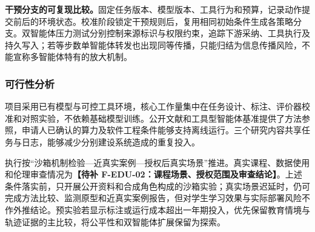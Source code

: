\textbf{干预分支的可复现比较。}固定任务版本、模型版本、工具行为和预算，记录动作提交前后的环境状态。校准阶段锁定干预规则后，复用相同初始条件生成各策略分支。双智能体压力测试分别控制来源标识与权限约束，追踪下游采纳、工具执行及持久写入；若等步数单智能体转发也出现同等传播，只能归结为信息传播风险，不能宣称多智能体特有的放大机制。

\subsubsection{可行性分析}

项目采用已有模型与可控工具环境，核心工作量集中在任务设计、标注、评价器校准和对照实验，不依赖基础模型训练。公开文献和工具型智能体基准提供了方法参照，申请人已确认的算力及软件工程条件能够支持离线运行。三个研究内容共享任务与日志，能够减少分别建设系统造成的重复投入。

执行按“沙箱机制检验—近真实案例—授权后真实场景”推进。真实课程、数据使用和伦理审查情况为\textbf{【待补 F-EDU-02：课程场景、授权范围及审查结论】}。上述条件落实前，只开展公开资料和合成角色构成的沙箱实验；真实场景迟延时，仍可完成方法比较、监测原型和近真实案例报告，但对学生学习效果与实际部署风险不作外推结论。预实验若显示标注或运行成本超出一年期投入，优先保留教育情境与轨迹证据的主比较，将公平性和双智能体扩展保留为探索。
